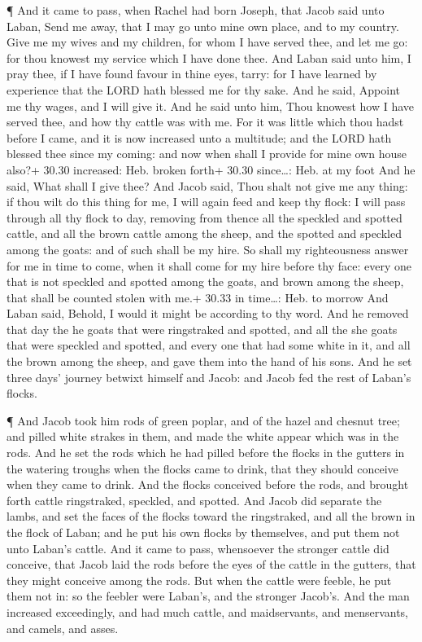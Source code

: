  ¶ And it came to pass, when Rachel had born Joseph, that
Jacob said unto Laban, Send me away, that I may go unto mine own place,
and to my country.  Give me my wives and my children, for
whom I have served thee, and let me go: for thou knowest my service
which I have done thee.  And Laban said unto him, I pray
thee, if I have found favour in thine eyes, tarry: for I have learned by
experience that the LORD hath blessed me for thy sake.  And
he said, Appoint me thy wages, and I will give it.  And he
said unto him, Thou knowest how I have served thee, and how thy cattle
was with me.  For it was little which thou hadst before I
came, and it is now increased unto a multitude; and the LORD hath
blessed thee since my coming: and now when shall I provide for mine own
house also?+ 30.30 increased: Heb. broken forth+ 30.30 since\ldots: Heb.
at my foot  And he said, What shall I give thee? And Jacob
said, Thou shalt not give me any thing: if thou wilt do this thing for
me, I will again feed and keep thy flock:  I will pass
through all thy flock to day, removing from thence all the speckled and
spotted cattle, and all the brown cattle among the sheep, and the
spotted and speckled among the goats: and of such shall be my hire.
 So shall my righteousness answer for me in time to come,
when it shall come for my hire before thy face: every one that is not
speckled and spotted among the goats, and brown among the sheep, that
shall be counted stolen with me.+ 30.33 in time\ldots: Heb. to morrow
 And Laban said, Behold, I would it might be according to
thy word.  And he removed that day the he goats that were
ringstraked and spotted, and all the she goats that were speckled and
spotted, and every one that had some white in it, and all the brown
among the sheep, and gave them into the hand of his sons. 
And he set three days' journey betwixt himself and Jacob: and Jacob fed
the rest of Laban's flocks.

 ¶ And Jacob took him rods of green poplar, and of the
hazel and chesnut tree; and pilled white strakes in them, and made the
white appear which was in the rods.  And he set the rods
which he had pilled before the flocks in the gutters in the watering
troughs when the flocks came to drink, that they should conceive when
they came to drink.  And the flocks conceived before the
rods, and brought forth cattle ringstraked, speckled, and spotted.
 And Jacob did separate the lambs, and set the faces of the
flocks toward the ringstraked, and all the brown in the flock of Laban;
and he put his own flocks by themselves, and put them not unto Laban's
cattle.  And it came to pass, whensoever the stronger
cattle did conceive, that Jacob laid the rods before the eyes of the
cattle in the gutters, that they might conceive among the rods.
 But when the cattle were feeble, he put them not in: so
the feebler were Laban's, and the stronger Jacob's.  And
the man increased exceedingly, and had much cattle, and maidservants,
and menservants, and camels, and asses.

